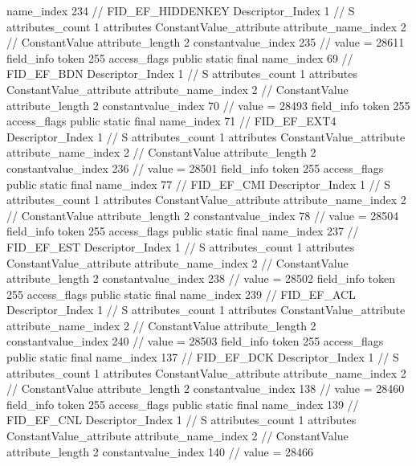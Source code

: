 {{{{{				name_index	234		// FID_EF_HIDDENKEY
				Descriptor_Index	1		// S
				attributes_count	1
				attributes {
				ConstantValue_attribute {
					attribute_name_index	2		// ConstantValue
					attribute_length	2
					constantvalue_index	235		// value = 28611
				}
				}
			}
			field_info {
				token	255
				access_flags	public static final
				name_index	69		// FID_EF_BDN
				Descriptor_Index	1		// S
				attributes_count	1
				attributes {
				ConstantValue_attribute {
					attribute_name_index	2		// ConstantValue
					attribute_length	2
					constantvalue_index	70		// value = 28493
				}
				}
			}
			field_info {
				token	255
				access_flags	public static final
				name_index	71		// FID_EF_EXT4
				Descriptor_Index	1		// S
				attributes_count	1
				attributes {
				ConstantValue_attribute {
					attribute_name_index	2		// ConstantValue
					attribute_length	2
					constantvalue_index	236		// value = 28501
				}
				}
			}
			field_info {
				token	255
				access_flags	public static final
				name_index	77		// FID_EF_CMI
				Descriptor_Index	1		// S
				attributes_count	1
				attributes {
				ConstantValue_attribute {
					attribute_name_index	2		// ConstantValue
					attribute_length	2
					constantvalue_index	78		// value = 28504
				}
				}
			}
			field_info {
				token	255
				access_flags	public static final
				name_index	237		// FID_EF_EST
				Descriptor_Index	1		// S
				attributes_count	1
				attributes {
				ConstantValue_attribute {
					attribute_name_index	2		// ConstantValue
					attribute_length	2
					constantvalue_index	238		// value = 28502
				}
				}
			}
			field_info {
				token	255
				access_flags	public static final
				name_index	239		// FID_EF_ACL
				Descriptor_Index	1		// S
				attributes_count	1
				attributes {
				ConstantValue_attribute {
					attribute_name_index	2		// ConstantValue
					attribute_length	2
					constantvalue_index	240		// value = 28503
				}
				}
			}
			field_info {
				token	255
				access_flags	public static final
				name_index	137		// FID_EF_DCK
				Descriptor_Index	1		// S
				attributes_count	1
				attributes {
				ConstantValue_attribute {
					attribute_name_index	2		// ConstantValue
					attribute_length	2
					constantvalue_index	138		// value = 28460
				}
				}
			}
			field_info {
				token	255
				access_flags	public static final
				name_index	139		// FID_EF_CNL
				Descriptor_Index	1		// S
				attributes_count	1
				attributes {
				ConstantValue_attribute {
					attribute_name_index	2		// ConstantValue
					attribute_length	2
					constantvalue_index	140		// value = 28466
				}
				}
}}}}}
